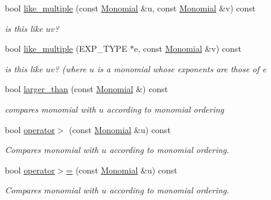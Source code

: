 \begin{Indent}
\begin{DoxyCompactItemize}
\mbox{\label{class_monomial_adec4a37e9e36f821ae69ca00eb087961}} 
bool \hyperlink{class_monomial_adec4a37e9e36f821ae69ca00eb087961}{like\+\_\+multiple} (const \hyperlink{class_monomial}{Monomial} \&u, const \hyperlink{class_monomial}{Monomial} \&v) const
\begin{DoxyCompactList}\small\item\em is {\ttfamily this} like $uv$? \end{DoxyCompactList}\item 
\mbox{\label{class_monomial_ab2989052f946017870269c19b2108b55}} 
bool \hyperlink{class_monomial_ab2989052f946017870269c19b2108b55}{like\+\_\+multiple} (E\+X\+P\+\_\+\+T\+Y\+PE $\ast$e, const \hyperlink{class_monomial}{Monomial} \&v) const
\begin{DoxyCompactList}\small\item\em is {\ttfamily this} like $uv$? (where $u$ is a monomial whose exponents are those of {\ttfamily e} \end{DoxyCompactList}\item 
\mbox{\label{class_monomial_ab50a4f90c210bcaf6e21fc16028a121a}} 
bool \hyperlink{class_monomial_ab50a4f90c210bcaf6e21fc16028a121a}{larger\+\_\+than} (const \hyperlink{class_monomial}{Monomial} \&) const
\begin{DoxyCompactList}\small\item\em compares monomial with $u$ according to monomial ordering \end{DoxyCompactList}\item 
\mbox{\label{class_monomial_ad660e085a10e15ba0e13bcd9790994d0}} 
bool \hyperlink{class_monomial_ad660e085a10e15ba0e13bcd9790994d0}{operator$>$} (const \hyperlink{class_monomial}{Monomial} \&u) const
\begin{DoxyCompactList}\small\item\em Compares monomial with $u$ according to monomial ordering. \end{DoxyCompactList}\item 
\mbox{\label{class_monomial_ae6607ae89a4e6ee332b3a69266d133d9}} 
bool \hyperlink{class_monomial_ae6607ae89a4e6ee332b3a69266d133d9}{operator$>$=} (const \hyperlink{class_monomial}{Monomial} \&u) const
\begin{DoxyCompactList}\small\item\em Compares monomial with $u$ according to monomial ordering. \end{DoxyCompactList}\item 

\end{DoxyCompactItemize}
\end{Indent}
